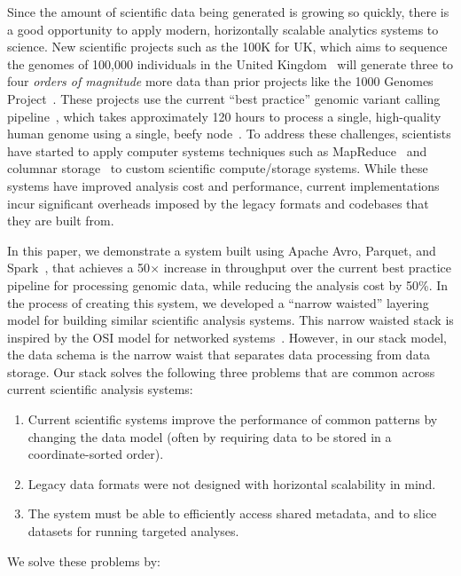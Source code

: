 \documentclass{acm_proc_article-sp}
\begin{document}
Since the amount of scientific data being generated is growing so quickly, there is a good opportunity to apply
modern, horizontally scalable analytics systems to science. New scientific
projects such as the 100K for UK, which aims to sequence the genomes of 100,000 individuals in the
United Kingdom~\cite{uk100k} will generate three to four \emph{orders of magnitude} more data than
prior projects like the 1000 Genomes Project~\cite{siva08}. These projects use the current ``best
practice'' genomic variant calling pipeline~\cite{auwera13}, which takes approximately 120 hours to
process a single, high-quality human genome using a single, beefy node~\cite{talwalkar14}. To address
these challenges, scientists have started to apply computer systems techniques such as
MapReduce~\cite{langmead09, mckenna10, schatz09} and columnar storage~\cite{fritz11} to custom
scientific compute/storage systems. While these systems have improved analysis cost and performance,
current implementations incur significant overheads imposed by the legacy formats and
codebases that they are built from.

In this paper, we demonstrate a system built using Apache Avro, Parquet, and Spark~\cite{avro, parquet,
zaharia10}, that achieves a 50$\times$ increase in throughput over the current best practice pipeline
for processing genomic data, while reducing the analysis cost by 50\%. In the process of creating this
system, we developed a ``narrow waisted'' layering model for building similar scientific analysis systems.
This narrow waisted stack is inspired by the OSI model for networked systems~\cite{zimmermann80}.
However, in our stack model, the data schema is the narrow waist that separates data processing from
data storage. Our stack solves the following three problems that are common across current scientific
analysis systems:

\begin{enumerate}
\item Current scientific systems improve the performance of common patterns by changing the data
model (often by requiring data to be stored in a coordinate-sorted order).
\item Legacy data formats were not designed with horizontal scalability in mind.
\item The system must be able to efficiently access shared metadata, and to slice datasets for running
targeted analyses.
\end{enumerate}

We solve these problems by:
\end{document}

